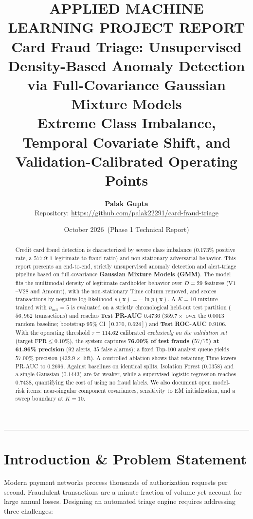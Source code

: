 \documentclass[11pt, a4paper]{article}
\title{
    \vspace{-1.2cm}
    {\Large \textbf{\textcolor{primaryblue}{APPLIED MACHINE LEARNING PROJECT REPORT}}}\\[0.4cm]
    {\LARGE \textbf{Card Fraud Triage: Unsupervised Density-Based Anomaly Detection via Full-Covariance Gaussian Mixture Models}}\\[0.3cm]
    {\large Extreme Class Imbalance, Temporal Covariate Shift, and Validation-Calibrated Operating Points}
}
\author{
    \textbf{Palak Gupta}\\
    Repository: \url{https://github.com/palak22291/card-fraud-triage}
}
\date{October 2026 \,(Phase 1 Technical Report)}
\begin{document}
\maketitle
\thispagestyle{empty}

\begin{abstract}
\noindent
Credit card fraud detection is characterized by severe class imbalance ($0.173\%$ positive rate, a $577.9 : 1$ legitimate-to-fraud ratio) and non-stationary adversarial behavior. This report presents an end-to-end, strictly unsupervised anomaly detection and alert-triage pipeline based on full-covariance \textbf{Gaussian Mixture Models (GMM)}. The model fits the multimodal density of legitimate cardholder behavior over $D = 29$ features ($\text{V1}$--$\text{V28}$ and $\text{Amount}$), with the non-stationary $\text{Time}$ column removed, and scores transactions by negative log-likelihood $s(\mathbf{x}) = -\ln p(\mathbf{x})$. A $K = 10$ mixture trained with $n_{\text{init}} = 5$ is evaluated on a strictly chronological held-out test partition ($56{,}962$ transactions) and reaches \textbf{Test PR-AUC $0.4736$} ($359.7\times$ over the $0.0013$ random baseline; bootstrap 95\% CI $[0.370,\, 0.624]$) and \textbf{Test ROC-AUC $0.9106$}. With the operating threshold $\tau = 114.62$ calibrated \emph{exclusively on the validation set} (target $\text{FPR} \le 0.10\%$), the system captures \textbf{76.00\% of test frauds ($57/75$) at 61.96\% precision} ($92$ alerts, $35$ false alarms); a fixed Top-$100$ analyst queue yields $57.00\%$ precision ($432.9\times$ lift). A controlled ablation shows that retaining $\text{Time}$ lowers PR-AUC to $0.2696$. Against baselines on identical splits, Isolation Forest ($0.0358$) and a single Gaussian ($0.1443$) are far weaker, while a supervised logistic regression reaches $0.7438$, quantifying the cost of using no fraud labels. We also document open model-risk items: near-singular component covariances, sensitivity to EM initialization, and a sweep boundary at $K = 10$.
\end{abstract}

\vspace{0.3cm}
\hrule
\vspace{0.4cm}

\section{Introduction \& Problem Statement}

Modern payment networks process thousands of authorization requests per second. Fraudulent transactions are a minute fraction of volume yet account for large annual losses. Designing an automated triage engine requires addressing three challenges:
\end{document}

